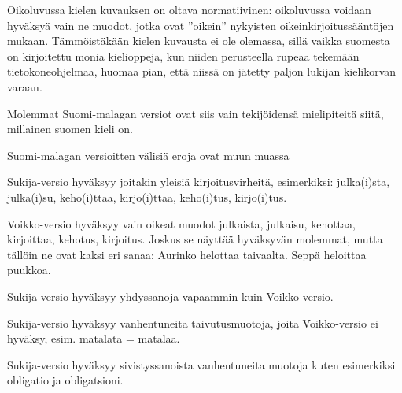 \documentclass[12pt]{article}
\begin{document}
Oikoluvussa kielen kuvauksen on oltava normatiivinen: oikoluvussa
voidaan hyväksyä vain ne muodot, jotka ovat ''oikein'' nykyisten
oikeinkirjoitussääntöjen mukaan. Tämmöistäkään kielen kuvausta ei ole
olemassa, sillä vaikka suomesta on kirjoitettu monia kielioppeja, kun
niiden perusteella rupeaa tekemään tietokoneohjelmaa, huomaa pian,
että niissä on jätetty paljon lukijan kielikorvan varaan.

Molemmat Suomi-malagan versiot ovat siis vain tekijöidensä
mielipiteitä siitä, millainen suomen kieli on.

\bigskip

Suomi-malagan versioitten välisiä eroja ovat muun muassa

Sukija-versio hyväksyy joitakin yleisiä kirjoitusvirheitä,
esimerkiksi: julka(i)sta, julka(i)su, keho(i)ttaa, kirjo(i)ttaa,
keho(i)tus, kirjo(i)tus.

Voikko-versio hyväksyy vain oikeat muodot julkaista, julkaisu,
kehottaa, kirjoittaa, kehotus, kirjoitus. Joskus se näyttää hyväksyvän
molemmat, mutta tällöin ne ovat kaksi eri sanaa: Aurinko helottaa
taivaalta. Seppä heloittaa puukkoa.

Sukija-versio hyväksyy yhdyssanoja vapaammin kuin Voikko-versio.

Sukija-versio hyväksyy vanhentuneita taivutusmuotoja, joita
Voikko-versio ei hyväksy, esim. matalata = matalaa.

Sukija-versio hyväksyy sivistyssanoista vanhentuneita muotoja kuten
esimerkiksi obligatio ja obligatsioni.



\end{document}
